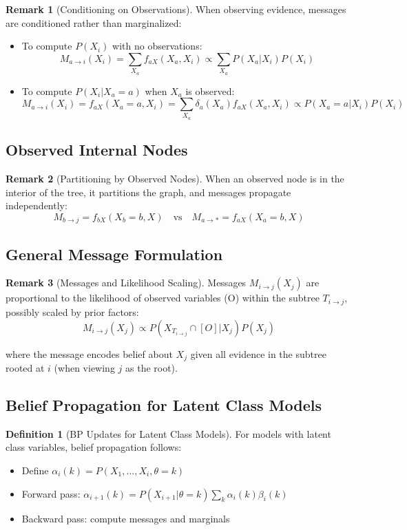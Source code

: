\documentclass[12pt,a4paper]{article}
\theoremstyle{definition}
\newtheorem{definition}{Definition}[section]
\newtheorem{remark}{Remark}[section]
\begin{document}
\begin{remark}[Conditioning on Observations]
When observing evidence, messages are conditioned rather than marginalized:

\begin{itemize}
    \item To compute $P(X_i)$ with no observations: 
    \[
    M_{a \to i}(X_i) = \sum_{X_a} f_{aX}(X_a, X_i) \propto \sum_{X_a} P(X_a | X_i) P(X_i)
    \]
    
    \item To compute $P(X_i | X_a = a)$ when $X_a$ is observed:
    \[
    M_{a \to i}(X_i) = f_{aX}(X_a=a, X_i) = \sum_{X_a} \delta_a(X_a) f_{aX}(X_a, X_i) \propto P(X_a = a | X_i) P(X_i)
    \]
\end{itemize}
\end{remark}

\subsection{Observed Internal Nodes}

\begin{remark}[Partitioning by Observed Nodes]
When an observed node is in the interior of the tree, it partitions the graph, and messages propagate independently:
\[
M_{b \to j} = f_{bX}(X_b = b, X) \quad \text{vs} \quad M_{a \to *} = f_{aX}(X_a = b, X)
\]
\end{remark}

\subsection{General Message Formulation}

\begin{remark}[Messages and Likelihood Scaling]
Messages $M_{i \to j}(X_j)$ are proportional to the likelihood of observed variables (O) within the subtree $T_{i \to j}$, possibly scaled by prior factors:
\[
M_{i \to j}(X_j) \propto P(X_{T_{i \to j}} \cap [O] | X_j) P(X_j)
\]

where the message encodes belief about $X_j$ given all evidence in the subtree rooted at $i$ (when viewing $j$ as the root).
\end{remark}

\subsection{Belief Propagation for Latent Class Models}

\begin{definition}[BP Updates for Latent Class Models]
For models with latent class variables, belief propagation follows:

\begin{itemize}
    \item Define $\alpha_i(k) = P(X_1, \ldots, X_i, \theta=k)$
    \item Forward pass: $\alpha_{i+1}(k) = P(X_{i+1} | \theta=k) \sum_k \alpha_i(k) \beta_i(k)$
    \item Backward pass: compute messages and marginals
\end{itemize}
\end{definition}
\end{document}

